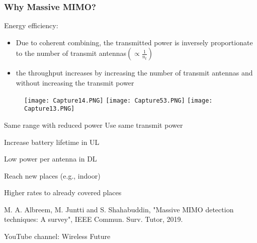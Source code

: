 \documentclass{beamer}
\begin{document}
\begin{frame}[fragile=singleslide]\frametitle{Why Massive MIMO?}
Energy efficiency:
\begin{itemize}
\item Due to coherent combining, the transmitted power is inversely proportionate to the number of transmit antennas$(\propto \frac{1}{n_{t}})$
\item the throughput increases by increasing the number of transmit antennas and without increasing the transmit power
\end{itemize}

\begin{figure}
  \texttt{[image: Capture14.PNG]}
  \texttt{[image: Capture53.PNG]}
  \texttt{[image: Capture13.PNG]}
\end{figure}

Same range with reduced power \;\;\;\;\;Use same transmit power

\begin{itemize}
	\begin{minipage}{0.49\linewidth}
        \item \scriptsize Increase battery lifetime in UL
        \item \scriptsize Low power per antenna in DL
    \end{minipage}
    \begin{minipage}{0.49\linewidth}
        \item \scriptsize Reach new places (e.g., indoor)
	    \item \scriptsize Higher rates to already covered places
   \end{minipage}
\end{itemize}



\tiny M. A. Albreem, M. Juntti and S. Shahabuddin, "Massive MIMO detection techniques: A survey", IEEE Commun. Surv. Tutor, 2019.


\tiny YouTube channel: Wireless Future
\end{frame}
\end{document}
